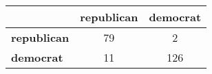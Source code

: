 \begin{tabular}{l|cc}
\toprule
&\textbf{republican} & \textbf{democrat}\\
\midrule
\textbf{republican} & 79 & 2\\
\textbf{democrat} & 11 & 126\\
\bottomrule
\end{tabular}
